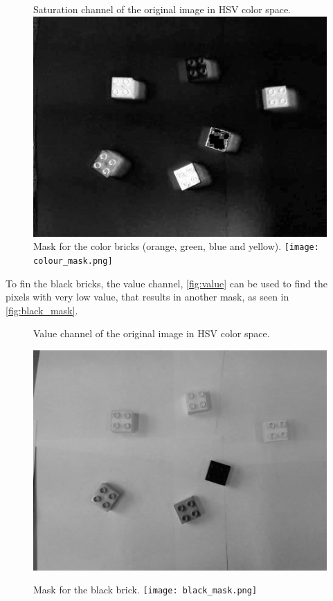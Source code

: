 \begin{figure}[H]
    \captionbox  %
    { 
        Saturation channel of the original image in HSV color space.              
        \label{fig:saturation}                                  
    }                                                                 
    {                                                                  
        \includegraphics[width=.4\textwidth]{figures/saturation.png}         
    }                                                                    
    \hspace{5pt}                                                          
    \captionbox
    {      
        Mask for the color bricks (orange, green, blue and yellow). 
        \label{fig:colour_mask}                                     
    }
    {
        \texttt{[image: colour\_mask.png]}            
    }                                                                             
\end{figure}

To fin the black bricks, the value channel, \autoref{fig:value} can be used to find the pixels with very low value, that results in another mask, as seen in \autoref{fig:black_mask}.

\begin{figure}[H]
    \captionbox  %
    {
        Value channel of the original image in HSV color space.                
        \label{fig:value}                                  
    }                                                                 
    {       
                                                                    
        \includegraphics[width=.4\textwidth]{figures/value.png}         
    }                                                                    
    \hspace{5pt}                                                          
    \captionbox
    {  
        Mask for the black brick.
        \label{fig:black_mask}                                     
    }
    {
        \texttt{[image: black\_mask.png]}            
    }                                                                             
\end{figure}

